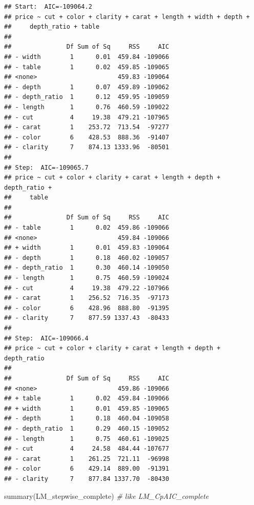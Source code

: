 \documentclass[
]{article}
\newenvironment{Shaded}{\begin{snugshade}}{\end{snugshade}}
\newcommand{\CommentTok}[1]{\textcolor[rgb]{0.56,0.35,0.01}{\textit{#1}}}
\newcommand{\FunctionTok}[1]{\textcolor[rgb]{0.00,0.00,0.00}{#1}}
\newcommand{\NormalTok}[1]{#1}
\begin{document}
\begin{verbatim}
## Start:  AIC=-109064.2
## price ~ cut + color + clarity + carat + length + width + depth + 
##     depth_ratio + table
## 
##               Df Sum of Sq     RSS     AIC
## - width        1      0.01  459.84 -109066
## - table        1      0.02  459.85 -109065
## <none>                      459.83 -109064
## - depth        1      0.07  459.89 -109062
## - depth_ratio  1      0.12  459.95 -109059
## - length       1      0.76  460.59 -109022
## - cut          4     19.38  479.21 -107965
## - carat        1    253.72  713.54  -97277
## - color        6    428.53  888.36  -91407
## - clarity      7    874.13 1333.96  -80501
## 
## Step:  AIC=-109065.7
## price ~ cut + color + clarity + carat + length + depth + depth_ratio + 
##     table
## 
##               Df Sum of Sq     RSS     AIC
## - table        1      0.02  459.86 -109066
## <none>                      459.84 -109066
## + width        1      0.01  459.83 -109064
## - depth        1      0.18  460.02 -109057
## - depth_ratio  1      0.30  460.14 -109050
## - length       1      0.75  460.59 -109024
## - cut          4     19.38  479.22 -107966
## - carat        1    256.52  716.35  -97173
## - color        6    428.96  888.80  -91395
## - clarity      7    877.59 1337.43  -80433
## 
## Step:  AIC=-109066.4
## price ~ cut + color + clarity + carat + length + depth + depth_ratio
## 
##               Df Sum of Sq     RSS     AIC
## <none>                      459.86 -109066
## + table        1      0.02  459.84 -109066
## + width        1      0.01  459.85 -109065
## - depth        1      0.18  460.04 -109058
## - depth_ratio  1      0.29  460.15 -109052
## - length       1      0.75  460.61 -109025
## - cut          4     24.58  484.44 -107677
## - carat        1    261.25  721.11  -96998
## - color        6    429.14  889.00  -91391
## - clarity      7    877.84 1337.70  -80430
\end{verbatim}

\begin{Shaded}
\begin{Highlighting}[]
\FunctionTok{summary}\NormalTok{(LM\_stepwise\_complete)   }\CommentTok{\# like LM\_CpAIC\_complete}
\end{Highlighting}
\end{Shaded}
\end{document}
